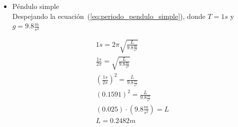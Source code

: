 \documentclass[twocolumn, 12pt]{article}
\begin{document}
\begin{itemize}[label=$\triangleright$]
    \item Péndulo simple \\ Despejando la
          ecuación~(\ref{eq:periodo_pendulo_simple}), donde $T = 1s$
          y $g = 9.8 \frac{m}{s^{2}}$

          \begin{equation*}
              \begin{gathered}
                  1s = 2 \pi \sqrt{\frac{L}{9.8 \frac{m}{s^{2}}}} \\
                  \frac{1s}{2 \pi} =  \sqrt{\frac{L}{9.8 \frac{m}{s^{2}}}} \\
                  {(\frac{1s}{2 \pi})}^{2} =  \frac{L}{9.8 \frac{m}{s^{2}}} \\
                  {(0.1591)}^{2} = \frac{L}{9.8 \frac{m}{s^{2}}} \\
                  (0.025) \cdot (9.8 \frac{m}{s^{2}}) = L \\
                  L = 0.2482 m
              \end{gathered}
          \end{equation*}


\end{itemize}
\end{document}
